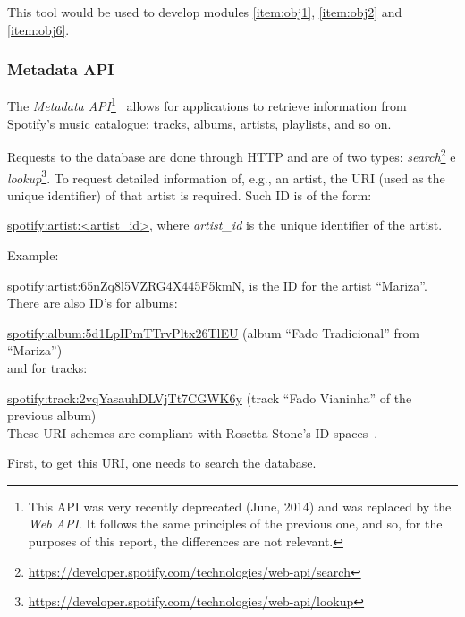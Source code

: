         This tool would be used to develop modules \ref{item:obj1}, \ref{item:obj2} and \ref{item:obj6}.
        


      \subsubsection{Metadata API} %
      \label{ssub:metadata_api}

        The \emph{Metadata API}\footnote{This API was very recently deprecated (June, 2014) and was replaced by the \emph{Web API}. It follows the same principles of the previous one, and so, for the purposes of this report, the differences are not relevant.}~\cite{spmetadata} allows for applications to retrieve information from Spotify's music catalogue: tracks, albums, artists, playlists, and so on.

        Requests to the database are done through HTTP and are of two types: \emph{search}\footnote{\url{https://developer.spotify.com/technologies/web-api/search}} e \emph{lookup}\footnote{\url{https://developer.spotify.com/technologies/web-api/lookup}}.
        To request detailed information of, e.g., an artist, the URI (used as the unique identifier) of that artist is required. Such ID is of the form:

        \url{spotify:artist:<artist_id>}, where \emph{artist\_id} is the unique identifier of the artist.

        Example:

        \url{spotify:artist:65nZq8l5VZRG4X445F5kmN}, is the ID for the artist ``Mariza''. \\

        There are also ID's for albums:

        \url{spotify:album:5d1LpIPmTTrvPltx26TlEU} (album ``Fado Tradicional'' from ``Mariza'') \\

         and for tracks:

         \url{spotify:track:2vqYasauhDLVjTt7CGWK6y} (track ``Fado Vianinha'' of the previous album) \\

        These URI schemes are compliant with Rosetta Stone's ID spaces~\cite{rosettastone}.

        First, to get this URI, one needs to search the database.

